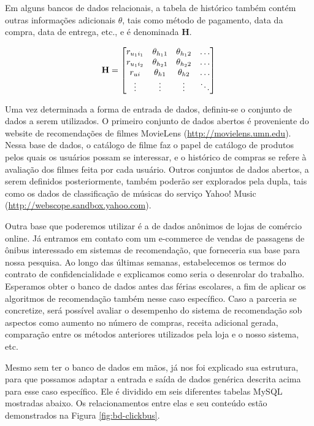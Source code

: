 Em alguns bancos de dados relacionais, a tabela de histórico também contém outras informações adicionais $\theta$, tais como método de pagamento, data da compra, data de entrega, etc., e é denominada $\mathbf{H}$.

\begin{equation} 
\mathbf{H} =
\begin{bmatrix} 
 r_{u_1 i_1} &  \theta_{h_1 1} &  \theta_{h_1 2} & \dots   \\
 r_{u_1 i_2} &  \theta_{h_2 1} &  \theta_{h_2 2} & \dots   \\
 r_{u i} &  \theta_{h 1} &  \theta_{h 2} & \dots   \\
 \vdots &  \vdots &  \vdots  & \ddots   \\
 \end{bmatrix} \\
\end{equation}

Uma vez determinada a forma de entrada de dados, definiu-se o conjunto de dados a serem utilizados. O primeiro conjunto de dados abertos é proveniente do website de recomendações de filmes MovieLens (\url{http://movielens.umn.edu}). Nessa base de dados, o catálogo de filme faz o papel de catálogo de produtos pelos quais os usuários possam se interessar, e o histórico de compras se refere à avaliação dos filmes feita por cada usuário. Outros conjuntos de dados abertos,  a serem definidos posteriormente, também poderão ser explorados pela dupla, tais como os dados de classificação de músicas do serviço Yahoo! Music (\url{http://webscope.sandbox.yahoo.com}).

Outra base que poderemos utilizar é a de dados anônimos de lojas de comércio online. Já entramos em contato com um e-commerce de vendas de passagens de ônibus interessado em sistemas de recomendação, que forneceria sua base  para nossa pesquisa. Ao longo das últimas semanas, estabelecemos os termos do contrato de confidencialidade e explicamos como seria o desenrolar do trabalho. Esperamos obter o banco de dados antes das férias escolares, a fim de aplicar os algoritmos de recomendação também nesse caso específico. Caso a parceria se concretize, será possível avaliar o desempenho do sistema de recomendação sob aspectos como aumento no número de compras, receita adicional gerada, comparação entre os métodos anteriores utilizados pela loja e o nosso sistema, etc.

Mesmo sem ter o banco de dados em mãos, já nos foi explicado sua estrutura, para que possamos adaptar a entrada e saída de dados genérica descrita acima para esse caso específico. Ele é dividido em seis diferentes tabelas MySQL mostradas abaixo. Os relacionamentos entre elas e seu conteúdo estão demonstrados na Figura \ref{fig:bd-clickbus}.


